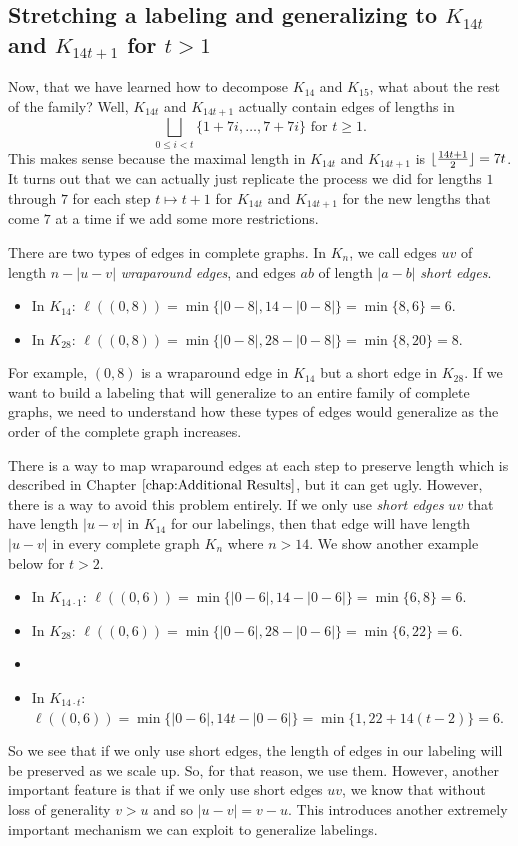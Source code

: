 \subsection{Stretching a labeling and generalizing to $K_{14t}$ and $K_{14t+1}$ for $t>1$}\label{sec:0,1constr-pt2}

  Now, that we have learned how to decompose $K_{14}$ and $K_{15}$, what about the rest of the family? Well, $K_{14t}$ and $K_{14t+1}$ actually contain edges of lengths in 
  $$\bigsqcup_{0\leq i< t} \{1+7i,\hdots,7+7i\}\text{ for }t\geq 1.$$
  This makes sense because the maximal length in $K_{14t}$ and $K_{14t+1}$ is $\lfloor\frac{14t+1}{2}\rfloor=7t$. It turns out that we can actually just replicate the process we did for lengths $1$ through $7$ for each step $t\mapsto t+1$ for $K_{14t}$ and $K_{14t+1}$ for the new lengths that come $7$ at a time if we add some more restrictions.

  There are two types of edges in complete graphs. In $K_{n}$, we call edges $uv$ of length $n-|u-v|$ \textit{wraparound edges}, and edges $ab$ of length $|a-b|$ \textit{short edges}. 
  \begin{itemize}
    \item[] In $K_{14}$: $\ell((0,8))=\min\{|0-8|,14-|0-8|\}=\min\{8,6\}=6$.
    \item[] In $K_{28}$: $\ell((0,8))=\min\{|0-8|,28-|0-8|\}=\min\{8,20\}=8$.
  \end{itemize} 
  For example, $(0,8)$ is a wraparound edge in $K_{14}$ but a short edge in $K_{28}$. If we want to build a labeling that will generalize to an entire family of complete graphs, we need to understand how these types of edges would generalize as the order of the complete graph increases.

  There is a way to map wraparound edges at each step to preserve length which is described in Chapter $\ref{chap:Additional Results}$, but it can get ugly. However, there is a way to avoid this problem entirely. If we only use \textit{short edges} $uv$ that have length $|u-v|$ in $K_{14}$ for our labelings, then that edge will have length $|u-v|$ in every complete graph $K_{n}$ where $n>14$. We show another example below for $t>2$.
\begin{center}
  \begin{itemize}
    \item[] In $K_{14\cdot 1}$: $\ell((0,6))=\min\{|0-6|,14-|0-6|\}=\min\{6,8\}=6$.
    \item[] In $K_{28}$: $\ell((0,6))=\min\{|0-6|,28-|0-6|\}=\min\{6,22\}=6$.
    \item[] \makebox[\linewidth]{$\vdots$}
    \item[] In $K_{14\cdot t}$: $\ell((0,6))=\min\{|0-6|,14t-|0-6|\}=\min\{1,22+14(t-2)\}=6$.
  \end{itemize}
\end{center}
  So we see that if we only use short edges, the length of edges in our labeling will be preserved as we scale up. So, for that reason, we use them. However, another important feature is that if we only use short edges $uv$, we know that without loss of generality $v>u$ and so $|u-v|=v-u$. This introduces another extremely important mechanism we can exploit to generalize labelings.

